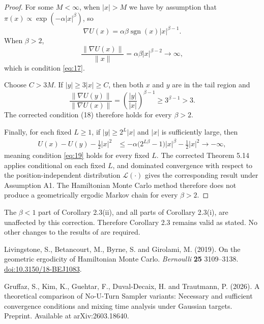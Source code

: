 \begin{proof}
For some $M<\infty$, when $|x|> M$ we have by assumption that
$\pi(x)\propto\exp(-\alpha|x|^\beta)$,
so
\[
 \nabla U(x)=\alpha\beta\operatorname{sgn}(x)|x|^{\beta-1}.
\]
When $\beta>2$,
\[
 \frac{\|\nabla U(x)\|}{\|x\|}
 =\alpha\beta|x|^{\beta-2}\longrightarrow\infty,
\]
which is condition \eqref{eq:17}.

Choose $C>3M$. If $|y|\geq3|x|\geq C$, then both $x$ and $y$ are in the tail
region and
\[
 \frac{\|\nabla U(y)\|}{\|\nabla U(x)\|}
 =\left(\frac{|y|}{|x|}\right)^{\beta-1}
 \geq3^{\beta-1}>3.
\]
The corrected condition (18) therefore holds for every $\beta>2$.

Finally, for each fixed $L\geq1$, if $|y|\geq2^L|x|$ and $|x|$ is
sufficiently large, then
\begin{align*}
 U(x)-U(y)-\frac12|x|^2
 &\leq
 -\alpha\bigl(2^{L\beta}-1\bigr)|x|^\beta
 -\frac12|x|^2
 \longrightarrow-\infty,
\end{align*}
meaning condition \eqref{eq:19} holds for every fixed $L$. The corrected
Theorem 5.14 applies conditional on each fixed $L$, and dominated convergence
with respect to the position-independent distribution $\mathcal{L}(\cdot)$ gives the
corresponding result under Assumption A1. The Hamiltonian Monte Carlo
method therefore does not produce a geometrically ergodic Markov chain for every
$\beta>2$.
\end{proof}

The $\beta<1$ part of Corollary 2.3(ii), and all parts of Corollary 2.3(i),
are unaffected by this correction. Therefore Corollary 2.3 remains valid as
stated. No other changes to the results of \cite{Livingstone2019} are
required.


\begin{thebibliography}{}

Livingstone, S., Betancourt, M., Byrne, S. and Girolami, M. (2019).
On the geometric ergodicity of Hamiltonian Monte Carlo.
\textit{Bernoulli} \textbf{25} 3109--3138.
\href{https://doi.org/10.3150/18-BEJ1083}{doi:10.3150/18-BEJ1083}.

Gruffaz, S., Kim, K., Guehtar, F., Duval-Decaix, H. and Trautmann, P. (2026).
A theoretical comparison of No-U-Turn Sampler variants: Necessary and sufficient
convergence conditions and mixing time analysis under Gaussian targets.
Preprint. Available at arXiv:2603.18640.

\end{thebibliography}

%
